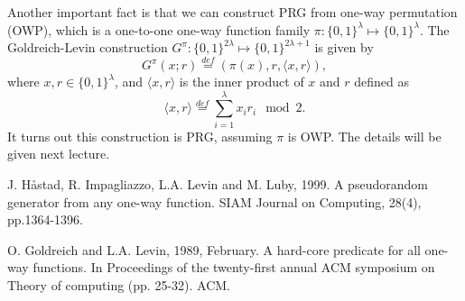 \documentclass[12pt]{article}
\newcommand{\eqdef}{\stackrel{def}{=}}
\newcommand{\bits}{\{0,1\}}
\newcommand{\angles}[1]{\langle #1 \rangle}
\theoremstyle{definition}
\begin{document}
Another important fact is that we can construct PRG from one-way permutation (OWP), which is a one-to-one one-way function family $\pi: \bits^\lambda \mapsto \bits^\lambda$. The Goldreich-Levin construction \cite{GL89} $G^\pi : \bits^{2\lambda} \mapsto \bits^{2\lambda+1}$ is given by
$$G^\pi(x; r) \eqdef (\pi(x), r, \angles{x,r}),$$
where $x, r\in\bits^\lambda$, and $\angles{x,r}$ is the inner product of $x$ and $r$ defined as
$$\angles{x,r} \eqdef \sum_{i=1}^\lambda x_ir_i \mod 2.$$
It turns out this construction is PRG, assuming $\pi$ is OWP. 
The details will be given next lecture.

\begin{thebibliography}{10}
J. H\aa stad, R. Impagliazzo, L.A. Levin and M. Luby, 1999. 
A pseudorandom generator from any one-way function. 
SIAM Journal on Computing, 28(4), pp.1364-1396.
	
O. Goldreich and L.A. Levin, 1989, February. 
A hard-core predicate for all one-way functions. 
In Proceedings of the twenty-first annual ACM symposium on Theory of computing (pp. 25-32). ACM.
\end{thebibliography}
\end{document}
